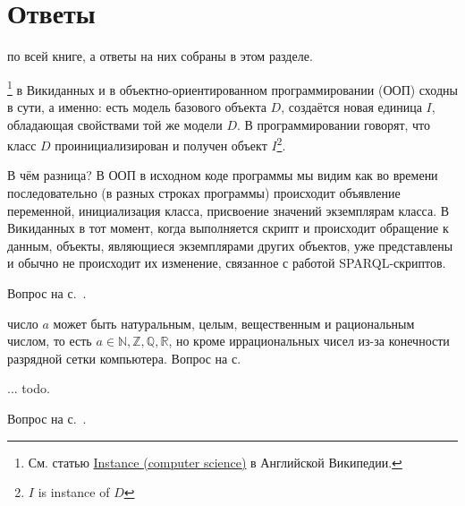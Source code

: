 \chapter{Ответы}
\label{ch:answers}


 по всей книге, а ответы на них собраны в этом разделе.

\begin{task}
    \label{answer:instance-in-OOP-vs-Wikidata}
    \footnote[][0cm]{См. статью 
            \href{https://en.wikipedia.org/wiki/Instance\_(computer\_science)}{Instance (computer science)} в Английской Википедии.
            }
    в Викиданных 
    и в объектно-ориентированном программировании (ООП) сходны в сути, а именно:
    есть модель базового объекта $D$, создаётся новая единица $I$, обладающая 
    свойствами той же модели $D$. 
    В программировании говорят, что класс $D$ проинициализирован 
    и получен объект $I$\footnote[][0cm]{$I$ is instance of $D$}.

    В чём разница? 
    В ООП в исходном коде программы мы видим как во времени последовательно 
    (в разных строках программы) происходит 
    объявление переменной, инициализация класса, 
    присвоение значений экземплярам класса.
    В Викиданных в тот момент, когда выполняется скрипт и происходит обращение 
    к данным, объекты, являющиеся экземплярами других объектов, 
    уже представлены и обычно не происходит их изменение, 
    связанное с работой SPARQL-скриптов.

    \small{Вопрос на с.~\pageref{question:instance-in-OOP-vs-Wikidata}.}
\end{task}


\begin{task}
    \label{answer:guess_numbers_task}
     число $ a $ может быть натуральным, целым, вещественным и рациональным числом, то есть $ a \in \mathbb{N},\mathbb{Z}, \mathbb{Q}, \mathbb{R} $, но кроме иррациональных чисел из-за конечности разрядной сетки компьютера. 
    \small{Вопрос на с.~\pageref{question:text}}
\end{task}

\begin{task}
    \label{answer:global-vars-pros-cons}
     ... todo. 

    \small{Вопрос на с.~\pageref{fig:block:proc:swap:colors}.}
\end{task}


